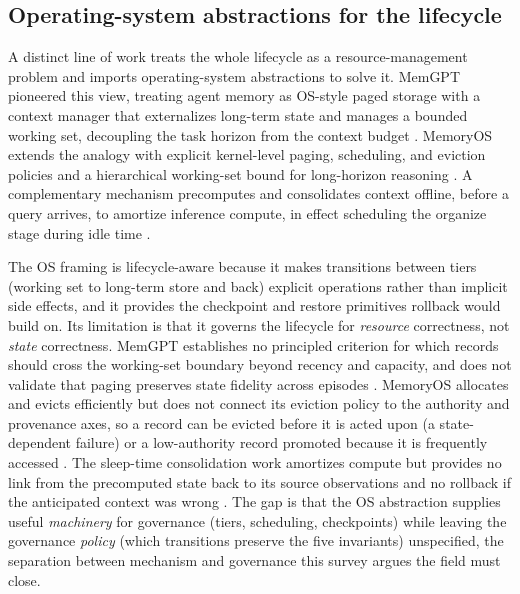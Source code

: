 \subsection{Operating-system abstractions for the lifecycle}\label{subsec:os}

A distinct line of work treats the whole lifecycle as a resource-management problem and imports operating-system abstractions to solve it. MemGPT pioneered this view, treating agent memory as OS-style paged storage with a context manager that externalizes long-term state and manages a bounded working set, decoupling the task horizon from the context budget \citep{packer2024memgptllmsoperatingsystems}. MemoryOS extends the analogy with explicit kernel-level paging, scheduling, and eviction policies and a hierarchical working-set bound for long-horizon reasoning \citep{kang2025memoryosaiagent}. A complementary mechanism precomputes and consolidates context offline, before a query arrives, to amortize inference compute, in effect scheduling the organize stage during idle time \citep{lin2025sleeptimecompute}.

The OS framing is lifecycle-aware because it makes transitions between tiers (working set to long-term store and back) explicit operations rather than implicit side effects, and it provides the checkpoint and restore primitives rollback would build on. Its limitation is that it governs the lifecycle for \emph{resource} correctness, not \emph{state} correctness. MemGPT establishes no principled criterion for which records should cross the working-set boundary beyond recency and capacity, and does not validate that paging preserves state fidelity across episodes \citep{packer2024memgptllmsoperatingsystems}. MemoryOS allocates and evicts efficiently but does not connect its eviction policy to the authority and provenance axes, so a record can be evicted before it is acted upon (a state-dependent failure) or a low-authority record promoted because it is frequently accessed \citep{kang2025memoryosaiagent}. The sleep-time consolidation work amortizes compute but provides no link from the precomputed state back to its source observations and no rollback if the anticipated context was wrong \citep{lin2025sleeptimecompute}. The gap is that the OS abstraction supplies useful \emph{machinery} for governance (tiers, scheduling, checkpoints) while leaving the governance \emph{policy} (which transitions preserve the five invariants) unspecified, the separation between mechanism and governance this survey argues the field must close.

